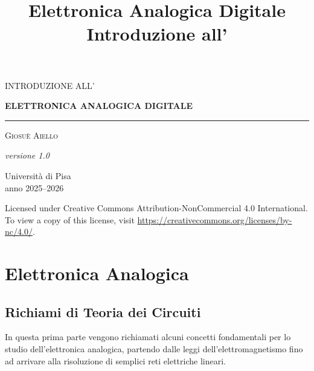 \documentclass[11pt,a4paper]{report}
\title{\color{notered}\textbf{Elettronica Analogica Digitale}\\[0.3em]\large Introduzione all'}
\author{}
\date{}
\begin{document}
\begin{titlepage}
  \centering
  \vspace*{0.8cm}
  {\Large\scshape\color{notedarkred}INTRODUZIONE ALL'\par}
  \vspace{0.6cm}
  {\Huge\bfseries\color{notered}\MakeUppercase{Elettronica Analogica Digitale}\par}
  \vspace{0.8cm}
  {\color{notered}\rule{8cm}{1.2pt}\par}
  \vspace{1.2cm}
  {\Large\scshape Giosu\`e Aiello\par}
  \vfill
  \noindent
  \begin{minipage}[b]{0.5\linewidth}
    \textit{versione 1.0}
  \end{minipage}%
  \begin{minipage}[b]{0.5\linewidth}
    \raggedleft
    Universit\`a di Pisa\\
    anno 2025--2026
  \end{minipage}
  \thispagestyle{empty}
\end{titlepage}

\vspace*{\fill}
\noindent {\Large \ccbync} Licensed under Creative Commons Attribution-NonCommercial 4.0 International. \\ To view a copy of this license, visit \url{https://creativecommons.org/licenses/by-nc/4.0/}.
\newpage

{\hypersetup{linkcolor=black}
\tableofcontents
\newpage}

\part{Elettronica Analogica}

\chapter{Richiami di Teoria dei Circuiti}

In questa prima parte vengono richiamati alcuni concetti fondamentali per lo studio dell'elettronica analogica, partendo dalle leggi dell'elettromagnetismo fino ad arrivare alla risoluzione di semplici reti elettriche lineari.
\end{document}
